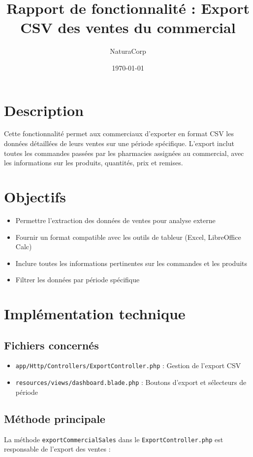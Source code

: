 \documentclass[12pt,a4paper]{article}
\title{Rapport de fonctionnalité : Export CSV des ventes du commercial}
\author{NaturaCorp}
\date{\today}
\begin{document}
\maketitle

\section{Description}
Cette fonctionnalité permet aux commerciaux d'exporter en format CSV les données détaillées de leurs ventes sur une période spécifique. L'export inclut toutes les commandes passées par les pharmacies assignées au commercial, avec les informations sur les produits, quantités, prix et remises.

\section{Objectifs}
\begin{itemize}
    \item Permettre l'extraction des données de ventes pour analyse externe
    \item Fournir un format compatible avec les outils de tableur (Excel, LibreOffice Calc)
    \item Inclure toutes les informations pertinentes sur les commandes et les produits
    \item Filtrer les données par période spécifique
\end{itemize}

\section{Implémentation technique}

\subsection{Fichiers concernés}
\begin{itemize}
    \item \texttt{app/Http/Controllers/ExportController.php} : Gestion de l'export CSV
    \item \texttt{resources/views/dashboard.blade.php} : Boutons d'export et sélecteurs de période
\end{itemize}

\subsection{Méthode principale}
La méthode \texttt{exportCommercialSales} dans le \texttt{ExportController.php} est responsable de l'export des ventes :
\end{document}
